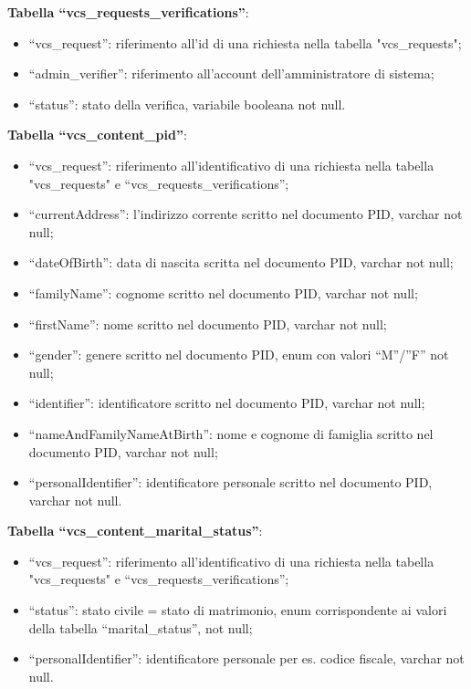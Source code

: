 \textbf{Tabella “vcs\_requests\_verifications”}:
\begin{itemize}
    \item “vcs\_request”: riferimento all'id di una richiesta nella tabella "vcs\_requests";  
    \item “admin\_verifier”: riferimento all'account dell'amministratore di sistema;  
    \item “status”: stato della verifica, variabile booleana not null. 
\end{itemize}

\textbf{Tabella “vcs\_content\_pid”}:
\begin{itemize}
    \item “vcs\_request”: riferimento all'identificativo di una richiesta nella tabella "vcs\_requests" e “vcs\_requests\_verifications”; 
    \item “currentAddress”: l’indirizzo corrente scritto nel documento PID, varchar not null; 
    \item “dateOfBirth”: data di nascita scritta nel documento PID, varchar not null;  
    \item “familyName”: cognome scritto nel documento PID, varchar not null; 
    \item “firstName”: nome scritto nel documento PID, varchar not null; 
    \item “gender”: genere scritto nel documento PID, enum con valori “M”/”F” not null; 
    \item “identifier”: identificatore scritto nel documento PID, varchar not null; 
    \item “nameAndFamilyNameAtBirth”: nome e cognome di famiglia scritto nel documento PID, varchar not null;
    \item “personalIdentifier”: identificatore personale scritto nel documento PID, varchar not null.
\end{itemize}

\textbf{Tabella “vcs\_content\_marital\_status”}:
\begin{itemize}
    \item “vcs\_request”: riferimento all'identificativo di una richiesta nella tabella "vcs\_requests" e “vcs\_requests\_verifications”; 
    \item “status”: stato civile = stato di matrimonio, enum corrispondente ai valori della tabella “marital\_status”, not null;  
    \item “personalIdentifier”: identificatore personale per es. codice fiscale, varchar not null.
\end{itemize}


